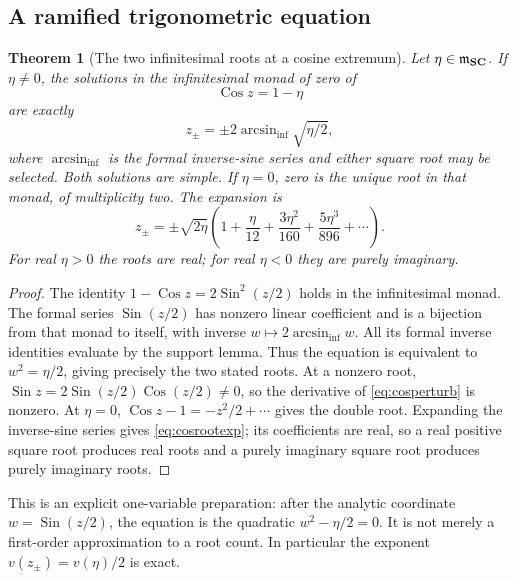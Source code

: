 \documentclass[11pt,letterpaper]{article}
\newtheorem{theorem}{Theorem}[section]
\theoremstyle{definition}
\theoremstyle{remark}
\newcommand{\SC}{\mathbf{SC}}
\newcommand{\Sin}{\operatorname{Sin}}
\newcommand{\Cos}{\operatorname{Cos}}
\numberwithin{equation}{section}
\begin{document}
\subsection{A ramified trigonometric equation}
\begin{theorem}[The two infinitesimal roots at a cosine extremum]\label{thm:cosroots}
Let $\eta\in\mm_{\SC}$. If $\eta\ne0$, the solutions in the infinitesimal monad of zero of
\begin{equation}\label{eq:cosperturb}
 \Cos z=1-\eta
\end{equation}
are exactly
\begin{equation}\label{eq:cosrootformula}
 z_\pm=\pm2\arcsin_{\mathrm{inf}}\sqrt{\eta/2},
\end{equation}
where $\arcsin_{\mathrm{inf}}$ is the formal inverse-sine series and either square root may be selected. Both solutions are simple. If $\eta=0$, zero is the unique root in that monad, of multiplicity two. The expansion is
\begin{equation}\label{eq:cosrootexp}
 z_\pm=\pm\sqrt{2\eta}
 \left(1+\frac\eta{12}+\frac{3\eta^2}{160}
                  +\frac{5\eta^3}{896}+\cdots\right).
\end{equation}
For real $\eta>0$ the roots are real; for real $\eta<0$ they are purely imaginary.
\end{theorem}
\begin{proof}
The identity $1-\Cos z=2\Sin^2(z/2)$ holds in the infinitesimal monad. The formal series $\Sin(z/2)$ has nonzero linear coefficient and is a bijection from that monad to itself, with inverse $w\mapsto2\arcsin_{\mathrm{inf}}w$. All its formal inverse identities evaluate by the support lemma. Thus the equation is equivalent to $w^2=\eta/2$, giving precisely the two stated roots. At a nonzero root, $\Sin z=2\Sin(z/2)\Cos(z/2)\ne0$, so the derivative of \eqref{eq:cosperturb} is nonzero. At $\eta=0$, $\Cos z-1=-z^2/2+\cdots$ gives the double root. Expanding the inverse-sine series gives \eqref{eq:cosrootexp}; its coefficients are real, so a real positive square root produces real roots and a purely imaginary square root produces purely imaginary roots.
\end{proof}
This is an explicit one-variable preparation: after the analytic coordinate $w=\Sin(z/2)$, the equation is the quadratic $w^2-\eta/2=0$. It is not merely a first-order approximation to a root count. In particular the exponent $v(z_\pm)=v(\eta)/2$ is exact.
\end{document}
